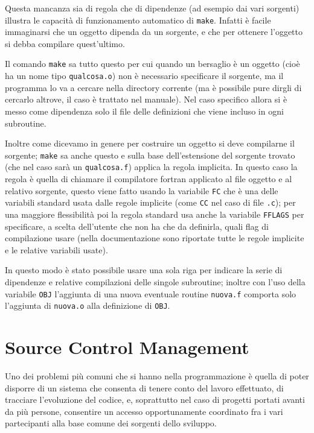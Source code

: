 Questa mancanza sia di regola che di dipendenze (ad esempio dai vari sorgenti) 
illustra le capacità di funzionamento automatico di \texttt{make}.
Infatti è facile immaginarsi che un oggetto dipenda da un sorgente, e che 
per ottenere l'oggetto si debba compilare quest'ultimo.

Il comando \texttt{make} sa tutto questo per cui quando un bersaglio è un
oggetto (cioè ha un nome tipo \texttt{qualcosa.o}) non è necessario
specificare il sorgente, ma il programma lo va a cercare nella directory
corrente (ma è possibile pure dirgli di cercarlo altrove, il caso è trattato
nel manuale).  Nel caso specifico allora si è messo come dipendenza solo il
file delle definizioni che viene incluso in ogni subroutine.

Inoltre come dicevamo in genere per costruire un oggetto si deve compilarne il
sorgente; \texttt{make} sa anche questo e sulla base dell'estensione del
sorgente trovato (che nel caso sarà un \texttt{qualcosa.f}) applica la regola
implicita.  In questo caso la regola è quella di chiamare il compilatore
fortran applicato al file oggetto e al relativo sorgente, questo viene fatto
usando la variabile \texttt{FC} che è una delle variabili standard usata dalle
regole implicite (come \texttt{CC} nel caso di file \texttt{.c}); per una
maggiore flessibilità poi la regola standard usa anche la variabile
\texttt{FFLAGS} per specificare, a scelta dell'utente che non ha che da
definirla, quali flag di compilazione usare (nella documentazione sono
riportate tutte le regole implicite e le relative variabili usate).

In questo modo è stato possibile usare una sola riga per indicare la serie di
dipendenze e relative compilazioni delle singole subroutine; inoltre con l'uso
della variabile \texttt{OBJ} l'aggiunta di una nuova eventuale routine
\texttt{nuova.f} comporta solo l'aggiunta di \texttt{nuova.o} alla definizione
di \texttt{OBJ}.


\section{Source Control Management}
\label{sec:build_scm}

Uno dei problemi più comuni che si hanno nella programmazione è quella di
poter disporre di un sistema che consenta di tenere conto del lavoro
effettuato, di tracciare l'evoluzione del codice, e, soprattutto nel caso di
progetti portati avanti da più persone, consentire un accesso opportunamente
coordinato fra i vari partecipanti alla base comune dei sorgenti dello
sviluppo.

